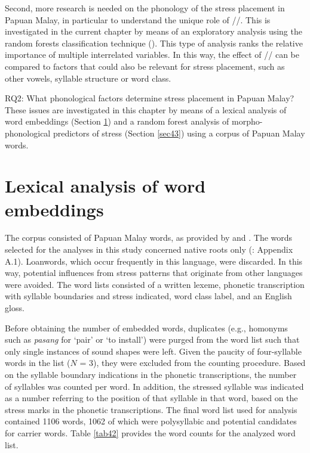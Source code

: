 Second, more research is needed on the phonology of the stress placement in Papuan Malay, in particular to understand the unique role of //. This is investigated in the current chapter by means of an exploratory analysis using the random forests classification technique (\citealt{breiman_random_2001}). This type of analysis ranks the relative importance of multiple interrelated variables. In this way, the effect of // can be compared to factors that could also be relevant for stress placement, such as other vowels, syllable structure or word class.\\ \par

\noindent RQ2: What phonological factors determine stress placement in Papuan Malay? \\

These issues are investigated in this chapter by means of a lexical analysis of word embeddings (Section \ref{sec42}) and a random forest analysis of morpho-phonological predictors of stress (Section \ref{sec43}) using a corpus of Papuan Malay words.

\section{Lexical analysis of word embeddings} \label{sec42}
The corpus consisted of Papuan Malay words, as provided by \citet{kluge_grammar_2017} and \citet{kluge_papuan_2014}. The words selected for the analyses in this study concerned native roots only (\citealt{kluge_grammar_2017}: Appendix A.1). Loanwords, which occur frequently in this language, were discarded. In this way, potential influences from stress patterns that originate from other languages were avoided. The word lists consisted of a written lexeme, phonetic transcription with syllable boundaries and stress indicated, word class label, and an English gloss.\par

Before obtaining the number of embedded words, duplicates (e.g., homonyms such as \textit{pasang} for `pair' or `to install') were purged from the word list such that only single instances of sound shapes were left. Given the paucity of four-syllable words in the list ($N$ = 3), they were excluded from the counting procedure. Based on the syllable boundary indications in the phonetic transcriptions, the number of syllables was counted per word. In addition, the stressed syllable was indicated as a number referring to the position of that syllable in that word, based on the stress marks in the phonetic transcriptions. The final word list used for analysis contained 1106 words, 1062 of which were polysyllabic and potential candidates for carrier words. Table \ref{tab42} provides the word counts for the analyzed word list.\par

